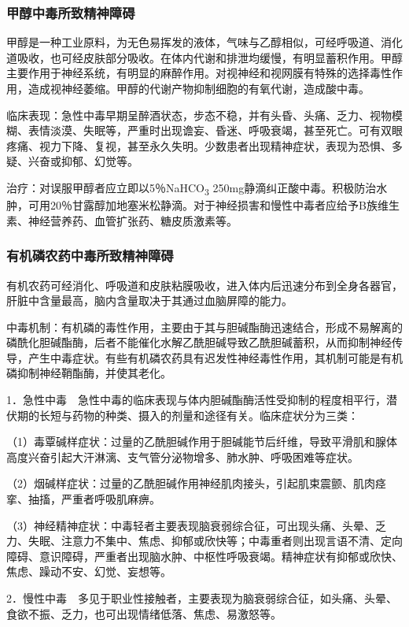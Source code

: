 \subsubsection{甲醇中毒所致精神障碍}

甲醇是一种工业原料，为无色易挥发的液体，气味与乙醇相似，可经呼吸道、消化道吸收，也可经皮肤部分吸收。在体内代谢和排泄均缓慢，有明显蓄积作用。甲醇主要作用于神经系统，有明显的麻醉作用。对视神经和视网膜有特殊的选择毒性作用，造成视神经萎缩。甲醇的代谢产物抑制细胞的有氧代谢，造成酸中毒。

临床表现：急性中毒早期呈醉酒状态，步态不稳，并有头昏、头痛、乏力、视物模糊、表情淡漠、失眠等，严重时出现谵妄、昏迷、呼吸衰竭，甚至死亡。可有双眼疼痛、视力下降、复视，甚至永久失明。少数患者出现精神症状，表现为恐惧、多疑、兴奋或抑郁、幻觉等。

治疗：对误服甲醇者应立即以5％NaHCO\textsubscript{3}
250mg静滴纠正酸中毒。积极防治水肿，可用20％甘露醇加地塞米松静滴。对于神经损害和慢性中毒者应给予B族维生素、神经营养药、血管扩张药、糖皮质激素等。

\subsubsection{有机磷农药中毒所致精神障碍}

有机农药可经消化、呼吸道和皮肤粘膜吸收，进入体内后迅速分布到全身各器官，肝脏中含量最高，脑内含量取决于其通过血脑屏障的能力。

中毒机制：有机磷的毒性作用，主要由于其与胆碱酯酶迅速结合，形成不易解离的磷酰化胆碱酯酶，后者不能催化水解乙酰胆碱导致乙酰胆碱蓄积，从而抑制神经传导，产生中毒症状。有些有机磷农药具有迟发性神经毒性作用，其机制可能是有机磷抑制神经鞘酯酶，并使其老化。

1．急性中毒　急性中毒的临床表现与体内胆碱酯酶活性受抑制的程度相平行，潜伏期的长短与药物的种类、摄入的剂量和途径有关。临床症状分为三类：

（1）毒覃碱样症状：过量的乙酰胆碱作用于胆碱能节后纤维，导致平滑肌和腺体高度兴奋引起大汗淋漓、支气管分泌物增多、肺水肿、呼吸困难等症状。

（2）烟碱样症状：过量的乙酰胆碱作用神经肌肉接头，引起肌束震颤、肌肉痉挛、抽搐，严重者呼吸肌麻痹。

（3）神经精神症状：中毒轻者主要表现脑衰弱综合征，可出现头痛、头晕、乏力、失眠、注意力不集中、焦虑、抑郁或欣快等；中毒重者则出现言语不清、定向障碍、意识障碍，严重者出现脑水肿、中枢性呼吸衰竭。精神症状有抑郁或欣快、焦虑、躁动不安、幻觉、妄想等。

2．慢性中毒　多见于职业性接触者，主要表现为脑衰弱综合征，如头痛、头晕、食欲不振、乏力，也可出现情绪低落、焦虑、易激怒等。


